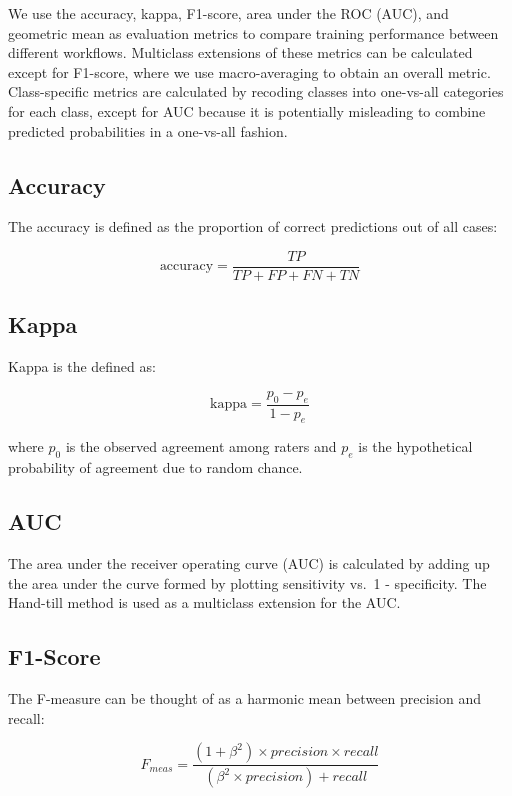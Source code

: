\documentclass[
]{report}
\begin{document}
We use the accuracy, kappa, F1-score, area under the ROC (AUC), and geometric mean as evaluation metrics to compare training performance between different workflows. Multiclass extensions of these metrics can be calculated except for F1-score, where we use macro-averaging to obtain an overall metric. Class-specific metrics are calculated by recoding classes into one-vs-all categories for each class, except for AUC because it is potentially misleading to combine predicted probabilities in a one-vs-all fashion.

\hypertarget{accuracy}{%
\subsection{Accuracy}\label{accuracy}}

The accuracy is defined as the proportion of correct predictions out of all cases:

\[
\text{accuracy} = \frac{TP}{TP + FP + FN + TN}
\label{eq:accuracy}
\]

\hypertarget{kappa}{%
\subsection{Kappa}\label{kappa}}

Kappa is the defined as:

\[
\text{kappa} = \frac{p_0 - p_e}{1 - p_e}
\label{eq:kappa}
\]

where \(p_0\) is the observed agreement among raters and \(p_e\) is the hypothetical probability of agreement due to random chance.

\hypertarget{auc}{%
\subsection{AUC}\label{auc}}

The area under the receiver operating curve (AUC) is calculated by adding up the area under the curve formed by plotting sensitivity vs.~1 - specificity. The Hand-till method is used as a multiclass extension for the AUC.

\hypertarget{f1-score}{%
\subsection{F1-Score}\label{f1-score}}

The F-measure can be thought of as a harmonic mean between precision and recall:

\[
F_{meas} = \frac{(1 + \beta^2) \times precision \times recall}{(\beta^2 \times precision) + recall}
\label{eq:f1}
\]
\end{document}
